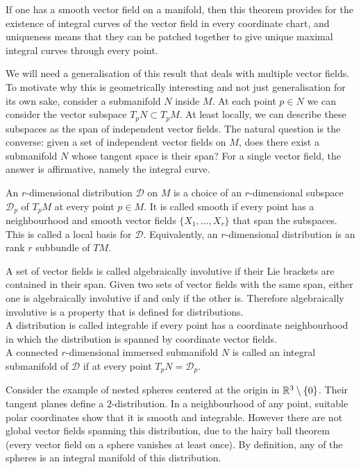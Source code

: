 If one has a smooth vector field on a manifold, then this theorem provides for the existence of integral curves of the vector field in every coordinate chart, and uniqueness means that they can be patched together to give unique maximal integral curves through every point.

We will need a generalisation of this result that deals with multiple vector fields.
To motivate why this is geometrically interesting and not just generalisation for its own sake, consider a submanifold $N$ inside $M$.
At each point $p \in N$ we can consider the vector subspace $T_pN \subset T_pM$.
At least locally, we can describe these subspaces as the span of independent vector fields.
The natural question is the converse: given a set of independent vector fields on $M$, does there exist a submanifold $N$ whose tangent space is their span?
For a single vector field, the answer is affirmative, namely the integral curve.

\begin{definition}
An $r$-dimensional distribution $\mathcal{D}$ on $M$ is a choice of an $r$-dimensional subspace $\mathcal{D}_p$ of $T_p M$ at every point $p \in M$.
It is called smooth if every point has a neighbourhood and smooth vector fields $\{X_1, \dots, X_r \}$ that span the subspaces.
This is called a local basis for $\mathcal{D}$.
Equivalently, an $r$-dimensional distribution is an rank $r$ subbundle of $TM$.

A set of vector fields is called algebraically involutive if their Lie brackets are contained in their span.
Given two sets of vector fields with the same span, either one is algebraically involutive if and only if the other is.
Therefore algebraically involutive is a property that is defined for distributions.\\

A distribution is called integrable if every point has a coordinate neighbourhood in which the distribution is spanned by coordinate vector fields.
\\
A connected $r$-dimensional immersed submanifold $N$ is called an integral submanifold of $\mathcal{D}$ if at every point $T_pN = \mathcal{D}_p$.
\\\textup{\cite[2.2.1,.2.2.2,2.3.2]{Sharpe1997}}
\end{definition}

Consider the example of nested spheres centered at the origin in $\mathbb{R}^3\setminus\{0\}$. 
Their tangent planes define a $2$-distribution.
In a neighbourhood of any point, suitable polar coordinates show that it is smooth and integrable.
However there are not global vector fields spanning this distribution, due to the hairy ball theorem (every vector field on a sphere vanishes at least once).
By definition, any of the spheres is an integral manifold of this distribution.


